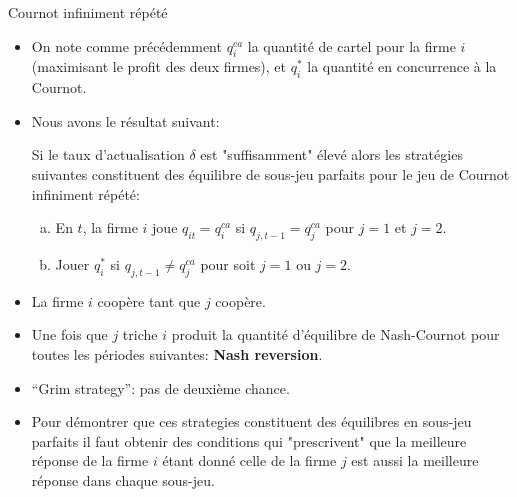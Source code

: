 \begin{frame}[allowframebreaks]{Cournot infiniment répété}
\begin{itemize}
    \item On note comme précédemment $q^{ca}_i$ la quantité de cartel pour la firme $i$(maximisant le profit des deux firmes), et $q_i^*$ 
    la quantité en concurrence à la Cournot.
    \item Nous avons le résultat suivant:  
    \begin{proposition}
        Si le taux d'actualisation $\delta$ est "suffisamment"  élevé 
         alors les stratégies suivantes constituent des équilibre de sous-jeu parfaits pour  
         le jeu de Cournot infiniment répété:  
         \begin{enumerate}[(a)]
             \item En $t$, la firme $i$ joue  $q_{it} =q^{ca}_i$ si $q_{j,t-1} =q^{ca}_j$ pour $j=1$ et $j=2$. 
             \item Jouer $q^*_i$ si $q_{j,t-1} \neq q^{ca}_j$ pour soit $j=1$ ou $j=2$.
         \end{enumerate}
    \end{proposition}
    \item La firme $i$ coopère tant que $j$ coopère.
    \item Une fois que $j$ triche $i$ produit la quantité d'équilibre de Nash-Cournot 
    pour toutes les périodes suivantes: \textbf{Nash reversion}.
    \item “Grim strategy”: pas de deuxième chance.
    \item Pour démontrer que ces strategies constituent des équilibres en sous-jeu parfaits il   
    faut obtenir des conditions qui "prescrivent" que la meilleure réponse 
    de la firme $i$ étant donné celle de la firme $j$ est aussi la meilleure réponse 
    dans chaque sous-jeu.
\end{itemize}

\end{frame}

